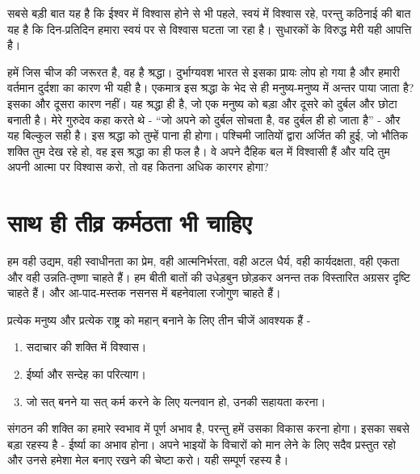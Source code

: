 
सबसे बड़ी बात यह है कि ईश्वर में विश्वास होने से भी पहले, स्वयं में विश्वास रहे, परन्तु कठिनाई की बात यह है कि दिन-प्रतिदिन हमारा स्वयं पर से विश्वास घटता जा रहा है। सुधारकों के विरुद्ध मेरी यही आपत्ति है। 

हमें जिस चीज की जरूरत है, वह है श्रद्धा। दुर्भाग्यवश भारत से इसका प्रायः लोप हो गया है और हमारी वर्तमान दुर्दशा का कारण भी यही है। एकमात्र इस श्रद्धा के भेद से ही मनुष्य-मनुष्य में अन्तर पाया जाता है? इसका और दूसरा कारण नहीं। यह श्रद्धा ही है, जो एक मनुष्य को बड़ा और दूसरे को दुर्बल और छोटा बनाती है। मेरे गुरुदेव कहा करते थे - “जो अपने को दुर्बल सोचता है, वह दुर्बल ही हो जाता है” - और यह बिल्कुल सही है। इस श्रद्धा को तुम्हें पाना ही होगा। पश्चिमी जातियों द्वारा अर्जित की हुई, जो भौतिक शक्ति तुम देख रहे हो, वह इस श्रद्धा का ही फल है। वे अपने दैहिक बल में विश्वासी हैं और यदि तुम अपनी आत्मा पर विश्वास करो, तो वह कितना अधिक कारगर होगा?


\section*{साथ ही तीव्र कर्मठता भी चाहिए}


हम वही उद्यम, वही स्वाधीनता का प्रेम, वही आत्मनिर्भरता, वही अटल धैर्य, वही कार्यदक्षता, वही एकता और वही उन्नति-तृष्णा चाहते हैं। हम बीती बातों की उधेड़बुन छोड़कर अनन्त तक विस्तारित अग्रसर दृष्टि चाहते हैं। और आ-पाद-मस्तक नसनस में बहनेवाला रजोगुण चाहते हैं। 

प्रत्येक मनुष्य और प्रत्येक राष्ट्र को महान् बनाने के लिए तीन चीजें आवश्यक हैं -

\begin{enumerate}
\item सदाचार की शक्ति में विश्वास। 

 \item ईर्ष्या और सन्देह का परित्याग। 

 \item जो सत् बनने या सत् कर्म करने के लिए यत्नवान हो, उनकी सहायता करना। 

\end{enumerate}

संगठन की शक्ति का हमारे स्वभाव में पूर्ण अभाव है, परन्तु हमें उसका विकास करना होगा। इसका सबसे बड़ा रहस्य है - ईर्ष्या का अभाव होना। अपने भाइयों के विचारों को मान लेने के लिए सदैव प्रस्तुत रहो और उनसे हमेशा मेल बनाए रखने की चेष्टा करो। यही सम्पूर्ण रहस्य है। 

